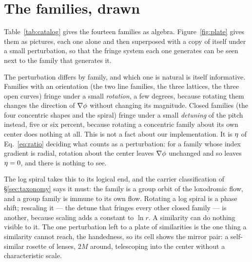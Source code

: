 \section{The families, drawn}
\label{app:catalog}

Table~\ref{tab:catalog} gives the fourteen families as algebra.
Figure~\ref{fig:plate} gives them as pictures, each one alone and then superposed
with a copy of itself under a small perturbation, so that the fringe system each
one generates can be seen next to the family that generates it.

The perturbation differs by family, and which one is natural is itself
informative. Families with an orientation (the two line families, the three
lattices, the three open curves) fringe under a small \emph{rotation}, a few
degrees, because rotating them changes the direction of $\nabla\phi$ without
changing its magnitude. Closed families (the four concentric shapes and the
spiral) fringe under a small \emph{detuning} of the pitch instead, five or six
percent, because rotating a concentric family about its own center does nothing at
all. This is not a fact about our implementation. It is $\eta$ of
Eq.~\ref{eq:ratio} deciding what counts as a perturbation: for a family whose
index gradient is radial, rotation about the center leaves $\nabla\phi$ unchanged
and so leaves $\eta=0$, and there is nothing to see.

The log spiral takes this to its logical end, and the carrier classification
of \S\ref{sec:taxonomy} says it must: the family is a group orbit of the
loxodromic flow, and a group family is immune to its own flow. Rotating a log
spiral is a phase shift; rescaling it --- the detune that fringes every other
closed family --- is another, because scaling adds a constant to $\ln r$. A
similarity can do nothing visible to it. The one perturbation left to a plate
of similarities is the one thing a similarity cannot reach, the handedness,
so its cell shows the mirror pair: a self-similar rosette of lenses,
$2M$ around, telescoping into the center without a characteristic scale.

